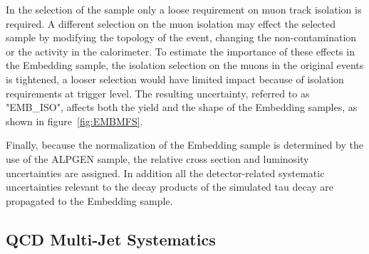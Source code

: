 %
%	
%

In the selection of the \Zmumu sample only a loose requirement on muon track isolation is required.
A different selection on the muon isolation may effect the selected sample by modifying the topology of the event, 
changing the non-\Zmumu contamination or the activity in the calorimeter. 
To estimate  the importance of these effects in the
Embedding sample, the isolation selection on the muons in the original \Zmumu events is tightened,
a looser selection would have limited impact because of isolation requirements at trigger level.
The resulting uncertainty, referred to as "EMB\_ISO", affects both the yield and the \mmc shape of 
the Embedding samples, as shown in figure~\ref{fig:EMBMFS}. 

Finally, because the normalization of the Embedding sample is determined by the use of the ALPGEN sample, 
the relative cross section and luminosity uncertainties are assigned. In addition
all the detector-related systematic uncertainties relevant to the decay products of the simulated tau 
decay are propagated to the Embedding sample.
 

\subsection{QCD Multi-Jet Systematics}\label{sec:qcdsys}

